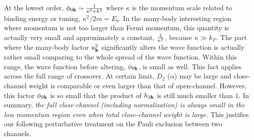 


At the lowest order, $\phi_{0\mathbf{k}}\sim\frac{1}{\kappa^{2}+k^{2}}$ where $\kappa$ is the momentum scale related to binding energy or tuning, $\kappa^{2}/2m=E_{b}$.     In the many-body interesting region where momentum is not too larger than Fermi momentum, this quantity is actually very small and approximately a constant, $\frac{1}{\kappa^{2}}$, because $\kappa{}\gg{}k_{F}$.  The part where the many-body factor $u_{\mathbf{k}}^{2}$ significantly alters the wave function is actually rather small comparing to the whole spread of the wave function.  Within this range, the wave function before altering, $\phi_{0\mathbf{k}}$, is small as well.   This fact applies across the full range of crossover.  At certain limit, $D_{2}$ ($\alpha$) may be large and close-channel weight is comparable or even larger than that of open-channel. However, this factor $\phi_{0\mathbf{k}}$ is so small that the product of $h_{2\mathbf{k}}$ is still much smaller than $1$.  
In summary, \emph{the full close-channel (including normalization) is always small in the low momentum region  even when total close-channel weight is large.}  This justifies our following perturbative treatment on the Pauli exclusion between two channels. 


